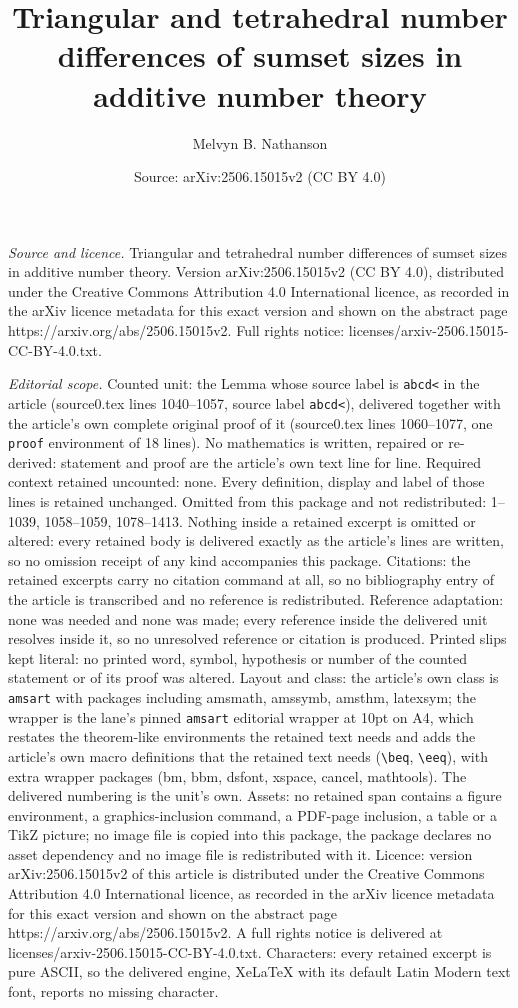 \documentclass[10pt,a4paper]{amsart}
\title[Triangular and tetrahedral number differences of sumset size]{Triangular and tetrahedral number differences of sumset sizes in additive number theory}
\author{Melvyn B. Nathanson}
\date{Source: arXiv:2506.15015v2 (CC BY 4.0)}
\begin{document}
\maketitle

\noindent\emph{Source and licence.} Triangular and tetrahedral number differences of sumset sizes in additive number theory. Version arXiv:2506.15015v2 (CC BY 4.0), distributed under the Creative Commons Attribution 4.0 International licence, as recorded in the arXiv licence metadata for this exact version and shown on the abstract page https://arxiv.org/abs/2506.15015v2. Full rights notice: licenses/arxiv-2506.15015-CC-BY-4.0.txt.\par\smallskip

\noindent\textit{Editorial scope.} Counted unit: the Lemma whose source label is \texttt{abcd<} in the article (source0.tex lines 1040--1057, source label \texttt{abcd<}), delivered together with the article's own complete original proof of it (source0.tex lines 1060--1077, one \texttt{proof} environment of 18 lines). No mathematics is written, repaired or re-derived: statement and proof are the article's own text line for line. Required context retained uncounted: none. Every definition, display and label of those lines is retained unchanged. Omitted from this package and not redistributed: 1--1039, 1058--1059, 1078--1413. Nothing inside a retained excerpt is omitted or altered: every retained body is delivered exactly as the article's lines are written, so no omission receipt of any kind accompanies this package. Citations: the retained excerpts carry no citation command at all, so no bibliography entry of the article is transcribed and no reference is redistributed. Reference adaptation: none was needed and none was made; every reference inside the delivered unit resolves inside it, so no unresolved reference or citation is produced. Printed slips kept literal: no printed word, symbol, hypothesis or number of the counted statement or of its proof was altered. Layout and class: the article's own class is \texttt{amsart} with packages including amsmath, amssymb, amsthm, latexsym; the wrapper is the lane's pinned \texttt{amsart} editorial wrapper at 10pt on A4, which restates the theorem-like environments the retained text needs and adds the article's own macro definitions that the retained text needs (\texttt{\textbackslash beq}, \texttt{\textbackslash eeq}), with extra wrapper packages (bm, bbm, dsfont, xspace, cancel, mathtools). The delivered numbering is the unit's own. Assets: no retained span contains a figure environment, a graphics-inclusion command, a PDF-page inclusion, a table or a TikZ picture; no image file is copied into this package, the package declares no asset dependency and no image file is redistributed with it. Licence: version arXiv:2506.15015v2 of this article is distributed under the Creative Commons Attribution 4.0 International licence, as recorded in the arXiv licence metadata for this exact version and shown on the abstract page https://arxiv.org/abs/2506.15015v2. A full rights notice is delivered at licenses/arxiv-2506.15015-CC-BY-4.0.txt. Characters: every retained excerpt is pure ASCII, so the delivered engine, XeLaTeX with its default Latin Modern text font, reports no missing character.
\end{document}
